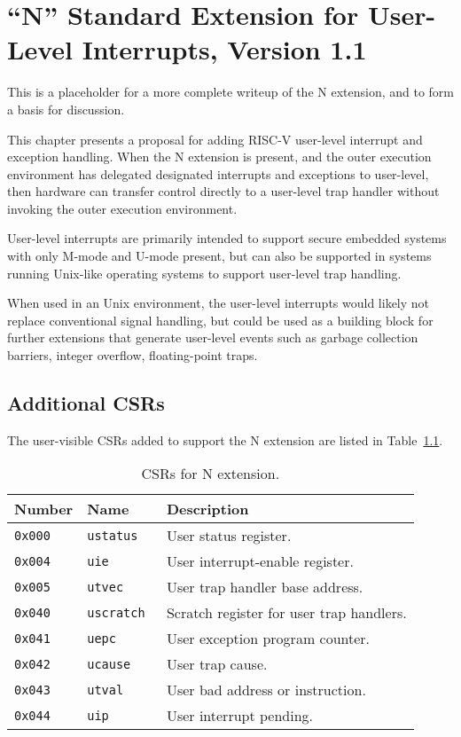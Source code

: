 \chapter{``N'' Standard Extension for User-Level Interrupts, Version 1.1}
\label{chap:n}

\begin{commentary}
  This is a placeholder for a more complete writeup of the N
  extension, and to form a basis for discussion.
\end{commentary}

This chapter presents a proposal for adding RISC-V user-level
interrupt and exception handling.  When the N extension is present,
and the outer execution environment has delegated designated
interrupts and exceptions to user-level, then hardware can transfer
control directly to a user-level trap handler without invoking the
outer execution environment.

\begin{commentary}
User-level interrupts are primarily intended to support secure
embedded systems with only M-mode and U-mode present, but can also be
supported in systems running Unix-like operating systems to support
user-level trap handling.

When used in an Unix environment, the user-level interrupts would
likely not replace conventional signal handling, but could be used as
a building block for further extensions that generate user-level
events such as garbage collection barriers, integer overflow,
floating-point traps.
\end{commentary}

\section{Additional CSRs}

The user-visible CSRs added to support the N extension are listed in
Table~\ref{tab:ncsrs}.

\begin{table}[hbt]
  \centering
  \begin{tabular}{|l|l|l|}
    \hline
    Number   & Name           & Description \\
    \hline
    \tt 0x000 & \tt ustatus    & User status register. \\
    \tt 0x004 & \tt uie        & User interrupt-enable register. \\
    \tt 0x005 & \tt utvec      & User trap handler base address. \\
    \tt 0x040 & \tt uscratch   & Scratch register for user trap handlers. \\
    \tt 0x041 & \tt uepc       & User exception program counter. \\
    \tt 0x042 & \tt ucause     & User trap cause. \\
    \tt 0x043 & \tt utval      & User bad address or instruction. \\
    \tt 0x044 & \tt uip        & User interrupt pending. \\
    \hline
  \end{tabular}
  \caption{CSRs for N extension.}
  \label{tab:ncsrs}
\end{table}

